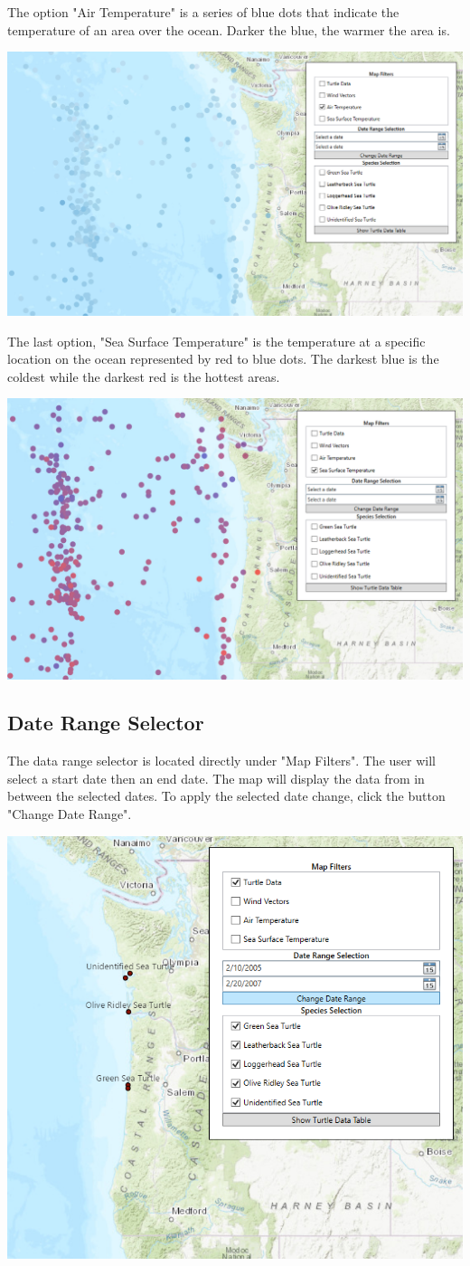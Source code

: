 \documentclass[onecolumn, draftclsnofoot,10pt, compsoc]{IEEEtran}
\begin{document}
The option "Air Temperature" is a series of blue dots that indicate the temperature of an area over the ocean. Darker the blue, the warmer the area is. 
\newline \begin{center}\includegraphics[width=0.5 \textwidth]{images/air-temp.PNG}\end{center}
The last option, "Sea Surface Temperature" is the temperature at a specific location on the ocean represented by red to blue dots. The darkest blue is the coldest while the darkest red is the hottest areas. 
\newline \begin{center}\includegraphics[width=0.5 \textwidth]{images/sea-surf-temp.PNG}\end{center}

\subsection{Date Range Selector}
The data range selector is located directly under "Map Filters". The user will select a start date then an end date. The map will display the data from in between the selected dates. To apply the selected date change, click the button "Change Date Range".
\newline \begin{center}\includegraphics[width=0.5 \textwidth]{images/date-change.PNG}\end{center}
\end{document}
